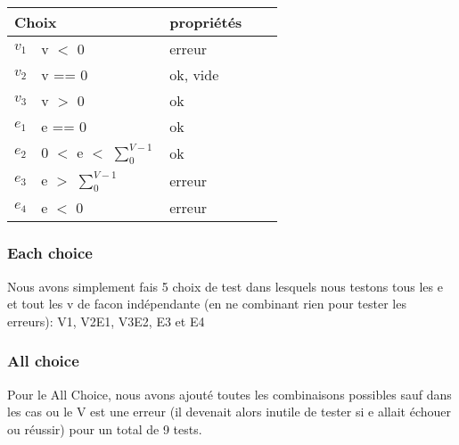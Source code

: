 \documentclass[11pt]{article}
\begin{document}
\begin{tabular}{|l|l|l|l|l|}
 \hline
 \multicolumn{2}{|l|}{Choix} & propriétés                              \\ \hline
 $v_1$                       & v $<$ 0                      & erreur   \\ \hline
 $v_2$                       & v == 0                       & ok, vide \\ \hline
 $v_3$                       & v $>$ 0                      & ok       \\ \hline \hline
 $e_1$                       & e == 0                       & ok       \\ \hline
 $e_2$                       & 0 $<$ e $<$ $\sum_{0}^{V-1}$ & ok       \\ \hline
 $e_3$                       & e $>$ $\sum_{0}^{V-1}$       & erreur   \\ \hline
 $e_4$                       & e $<$ 0                      & erreur   \\ \hline
\end{tabular}

\subsubsection{Each choice}
Nous avons simplement fais 5 choix de test dans lesquels nous testons tous les e et tout les v de facon indépendante (en ne combinant rien pour tester les erreurs): V1, V2E1, V3E2, E3 et E4
\subsubsection{All choice}
Pour le All Choice, nous avons ajouté toutes les combinaisons possibles sauf dans les cas ou le V est une erreur (il devenait alors inutile de tester si e allait échouer ou réussir) pour un total de 9 tests.
\end{document}
